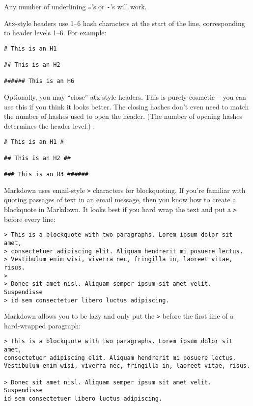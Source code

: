 Any number of underlining \texttt{=}'s or \texttt{-}'s will work.

Atx-style headers use 1--6 hash characters at the start of the line,
corresponding to header levels 1--6. For example:

\begin{verbatim}
# This is an H1

## This is an H2

###### This is an H6
\end{verbatim}

Optionally, you may ``close'' atx-style headers. This is purely
cosmetic -- you can use this if you think it looks better. The
closing hashes don't even need to match the number of hashes
used to open the header. (The number of opening hashes
determines the header level.) :

\begin{verbatim}
# This is an H1 #

## This is an H2 ##

### This is an H3 ######
\end{verbatim}

Markdown uses email-style \texttt{>} characters for blockquoting. If you're
familiar with quoting passages of text in an email message, then you
know how to create a blockquote in Markdown. It looks best if you hard
wrap the text and put a \texttt{>} before every line:

\begin{verbatim}
> This is a blockquote with two paragraphs. Lorem ipsum dolor sit amet,
> consectetuer adipiscing elit. Aliquam hendrerit mi posuere lectus.
> Vestibulum enim wisi, viverra nec, fringilla in, laoreet vitae, risus.
> 
> Donec sit amet nisl. Aliquam semper ipsum sit amet velit. Suspendisse
> id sem consectetuer libero luctus adipiscing.
\end{verbatim}

Markdown allows you to be lazy and only put the \texttt{>} before the first
line of a hard-wrapped paragraph:

\begin{verbatim}
> This is a blockquote with two paragraphs. Lorem ipsum dolor sit amet,
consectetuer adipiscing elit. Aliquam hendrerit mi posuere lectus.
Vestibulum enim wisi, viverra nec, fringilla in, laoreet vitae, risus.

> Donec sit amet nisl. Aliquam semper ipsum sit amet velit. Suspendisse
id sem consectetuer libero luctus adipiscing.
\end{verbatim}

